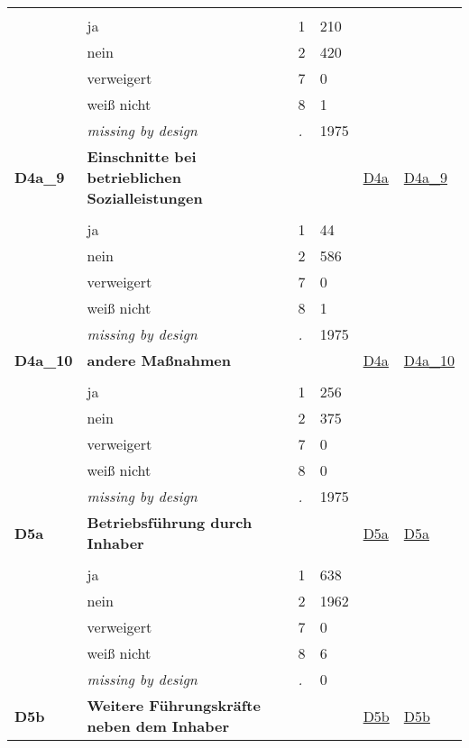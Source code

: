 \begin{longtable}{| L{2.45cm} | L{6cm} | C{1.5cm} | R{1cm} | C{2.25cm} | C{2.25cm} |}
   &  &  &  &  &  \\ 
   & ja & 1 & 210 &  &  \\ 
   & nein & 2 & 420 &  &  \\ 
   & verweigert & 7 & 0 &  &  \\ 
   & weiß nicht & 8 & 1 &  &  \\ 
   & \textit{missing by design} & \textit{.} & 1975 &  &  \\ 
   \midrule
\textbf{D4a\_9}\label{var:D4a:9} & \textbf{Einschnitte bei betrieblichen Sozialleistungen} &  &  & \hyperref[D4a]{D4a} & \hyperref[var:suf:D4a:9]{D4a\_9} \\ 
   &  &  &  &  &  \\ 
   & ja & 1 & 44 &  &  \\ 
   & nein & 2 & 586 &  &  \\ 
   & verweigert & 7 & 0 &  &  \\ 
   & weiß nicht & 8 & 1 &  &  \\ 
   & \textit{missing by design} & \textit{.} & 1975 &  &  \\ 
   \midrule
\textbf{D4a\_10}\label{var:D4a:10} & \textbf{andere Maßnahmen} &  &  & \hyperref[D4a]{D4a} & \hyperref[var:suf:D4a:10]{D4a\_10} \\ 
   &  &  &  &  &  \\ 
   & ja & 1 & 256 &  &  \\ 
   & nein & 2 & 375 &  &  \\ 
   & verweigert & 7 & 0 &  &  \\ 
   & weiß nicht & 8 & 0 &  &  \\ 
   & \textit{missing by design} & \textit{.} & 1975 &  &  \\ 
   \midrule
\textbf{D5a}\label{var:D5a} & \textbf{Betriebsführung durch Inhaber} &  &  & \hyperref[D5a]{D5a} & \hyperref[var:suf:D5a]{D5a} \\ 
   &  &  &  &  &  \\ 
   & ja & 1 & 638 &  &  \\ 
   & nein & 2 & 1962 &  &  \\ 
   & verweigert & 7 & 0 &  &  \\ 
   & weiß nicht & 8 & 6 &  &  \\ 
   & \textit{missing by design} & \textit{.} & 0 &  &  \\ 
   \midrule
\textbf{D5b}\label{var:D5b} & \textbf{Weitere Führungskräfte neben dem Inhaber} &  &  & \hyperref[D5b]{D5b} & \hyperref[var:suf:D5b]{D5b} \\ 

\end{longtable}
